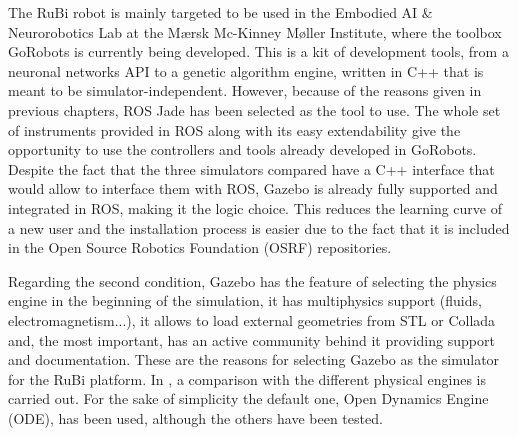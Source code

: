 The RuBi robot is mainly targeted to be used in the Embodied AI \& Neurorobotics Lab at the Mærsk Mc-Kinney Møller Institute, where the toolbox GoRobots is currently being developed.
This is a kit of development tools, from a neuronal networks API to a genetic algorithm engine, written in C++ that is meant to be simulator-independent.
However, because of the reasons given in previous chapters, ROS Jade \cite{ros} has been selected as the tool to use.
The whole set of instruments provided in ROS along with its easy extendability give the opportunity to use the controllers and tools already developed in GoRobots.
Despite the fact that the three simulators compared have a C++ interface that would allow to interface them with ROS, Gazebo is already fully supported and integrated in ROS, making it the logic choice.
This reduces the learning curve of a new user and the installation process is easier due to the fact that it is included in the Open Source Robotics Foundation (OSRF) repositories.

Regarding the second condition, Gazebo has the feature of selecting the physics engine in the beginning of the simulation, it has multiphysics support (fluids, electromagnetism...), it allows to load external geometries from STL or Collada and, the most important, has an active community behind it providing support and documentation. These are the reasons for selecting Gazebo as the simulator for the RuBi platform.
In \cite{physics_engine_gazebo_comparison}, a comparison with the different physical engines is carried out.
For the sake of simplicity the default one, Open Dynamics Engine (ODE), has been used, although the others have been tested.

